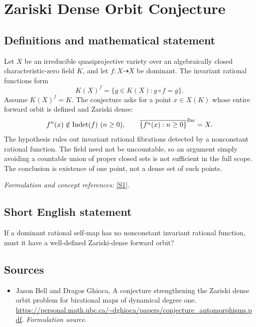 \documentclass[11pt]{article}
\begin{document}
\section*{\texorpdfstring{Zariski Dense Orbit Conjecture}{Zariski Dense Orbit Conjecture}}\label{484}
\subsection{Definitions and mathematical statement}
Let $X$ be an irreducible quasiprojective variety over an algebraically closed characteristic-zero field $K$, and let $f:X\dashrightarrow X$ be dominant. The invariant rational functions form
\[
 K(X)^f=\{g\in K(X):g\circ f=g\}.
\]
Assume $K(X)^f=K$. The conjecture asks for a point $x\in X(K)$ whose entire forward orbit is defined and Zariski dense:
\[
 f^n(x)\notin\operatorname{Indet}(f)\ (n\ge0),
 \qquad\overline{\{f^n(x):n\ge0\}}^{\rm Zar}=X.
\]
The hypothesis rules out invariant rational fibrations detected by a nonconstant rational function. The field need not be uncountable, so an argument simply avoiding a countable union of proper closed sets is not sufficient in the full scope. The conclusion is existence of one point, not a dense set of such points.
\par\smallskip\textit{Formulation and concept references:} \href{https://personal.math.ubc.ca/~dghioca/papers/conjecture_automorphisms.pdf}{[S1]}.

\subsection{Short English statement}
If a dominant rational self-map has no nonconstant invariant rational function, must it have a well-defined Zariski-dense forward orbit?
\subsection{Sources}
\begin{itemize}
\item[S1]Jason Bell and Dragos Ghioca, A conjecture strengthening the Zariski dense orbit problem for birational maps of dynamical degree one.
\url{https://personal.math.ubc.ca/~dghioca/papers/conjecture_automorphisms.pdf}.
\textit{Formulation source.}
\end{itemize}
\end{document}
